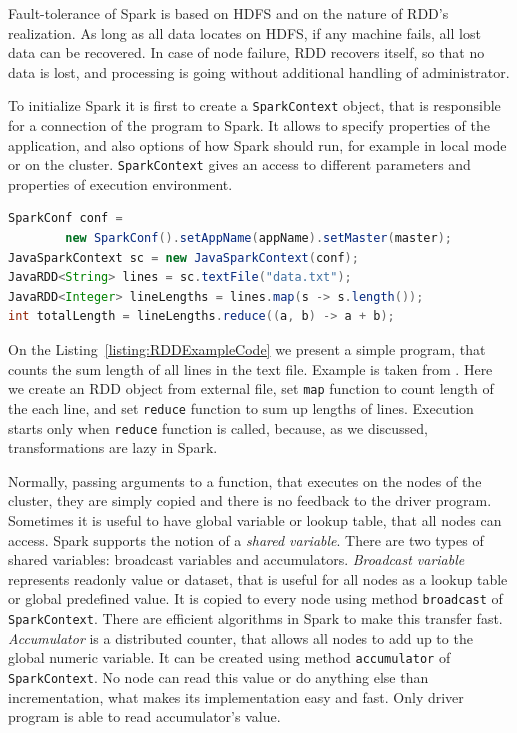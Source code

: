 Fault-tolerance of Spark is based on HDFS and on the nature of RDD's realization.
As long as all data locates on HDFS, if any machine fails, all lost data can be recovered.
In case of node failure, RDD recovers itself, so that no data is lost, and processing is going without additional handling of administrator.

To initialize Spark it is first to create a \lstinline{SparkContext} object, that is responsible for a connection of the program to Spark.
It allows to specify properties of the application, and also options of how Spark should run, for example in local mode or on the cluster.
\lstinline{SparkContext} gives an access to different parameters and properties of execution environment.

\begin{lstlisting}[float=h, caption=Example of RDD usage., label=listing:RDDExampleCode, language=Java]
SparkConf conf =
		new SparkConf().setAppName(appName).setMaster(master);
JavaSparkContext sc = new JavaSparkContext(conf);
JavaRDD<String> lines = sc.textFile("data.txt");
JavaRDD<Integer> lineLengths = lines.map(s -> s.length());
int totalLength = lineLengths.reduce((a, b) -> a + b);
\end{lstlisting}

On the Listing~\ref{listing:RDDExampleCode} we present a simple program, that counts the sum length of all lines in the text file.
Example is taken from \cite{Spark1}.
Here we create an RDD object from external file, set \lstinline{map} function to count length of the each line, and set \lstinline{reduce} function to sum up lengths of lines.
Execution starts only when \lstinline{reduce} function is called, because, as we discussed, transformations are lazy in Spark.

Normally, passing arguments to a function, that executes on the nodes of the cluster, they are simply copied and there is no feedback to the driver program.
Sometimes it is useful to have global variable or lookup table, that all nodes can access.
Spark supports the notion of a \textit{shared variable}.
There are two types of shared variables: broadcast variables and accumulators.
\textit{Broadcast variable}  represents readonly value or dataset, that is useful for all nodes as a lookup table or global predefined value.
It is copied to every node using method \lstinline{broadcast} of \lstinline{SparkContext}.
There are efficient algorithms in Spark to make this transfer fast.
\textit{Accumulator}  is a distributed counter, that allows all nodes to add up to the global numeric variable.
It can be created using method \lstinline{accumulator} of \lstinline{SparkContext}.
No node can read this value or do anything else than incrementation, what makes its implementation easy and fast.
Only driver program is able to read accumulator's value.

